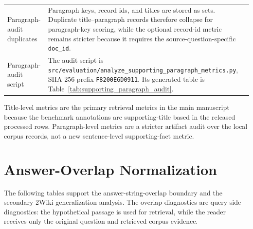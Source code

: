 \documentclass[10pt]{article}
\begin{document}
\begin{table}[t]
\begin{threeparttable}
\begin{tabularx}{\textwidth}{>{\raggedright\arraybackslash}p{}
                            >{\raggedright\arraybackslash}X}
Paragraph-audit duplicates & Paragraph keys, record ids, and titles are stored as sets. Duplicate title--paragraph records therefore collapse for paragraph-key scoring, while the optional record-id metric remains stricter because it requires the source-question-specific \texttt{doc\_id}. \\
Paragraph-audit script & The audit script is \texttt{src/evaluation/analyze\_supporting\_paragraph\_metrics.py}, SHA-256 prefix \texttt{F8200E6D0911}. Its generated table is Table~\ref{tab:supporting_paragraph_audit}. \\
\bottomrule
\end{tabularx}
\begin{tablenotes}
\footnotesize
\item Title-level metrics are the primary retrieval metrics in the main manuscript because the benchmark annotations are supporting-title based in the released processed rows. Paragraph-level metrics are a stricter artifact audit over the local corpus records, not a new sentence-level supporting-fact metric.
\end{tablenotes}
\end{threeparttable}
\end{table}

\clearpage
\section{Answer-Overlap Normalization}
\label{sec:supp_answer_overlap_normalization}

The following tables support the answer-string-overlap boundary and the secondary 2Wiki generalization analysis. The overlap diagnostics are query-side diagnostics: the hypothetical passage is used for retrieval, while the reader receives only the original question and retrieved corpus evidence.
\end{document}
